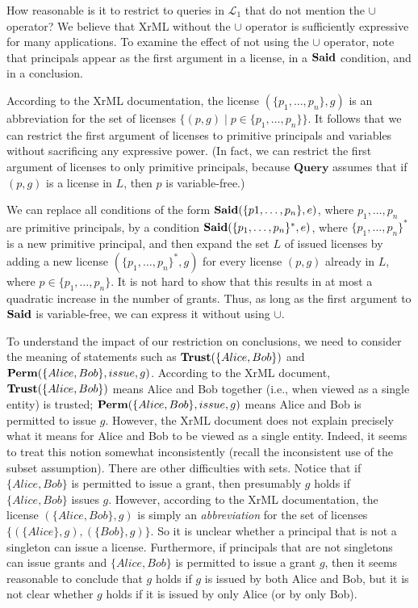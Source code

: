 \documentclass{acmtrans2m}
\newcommand{\<}{
}
\renewcommand{\>}{\rangle}
\newcommand{\union}{\cup}
\newcommand{\cL}{\mathcal{L}}
\newcommand{\Said}{\mathit{\bf Said}}
\newcommand{\Permitted}{\mathit{\bf Perm}}
\newcommand{\cc}{e}
\newcommand{\XProc}{\textbf{Query}}
\begin{document}
How reasonable is it to restrict to queries in $\cL_1$ that do not mention the $\union$ operator?  We
believe that XrML without the $\union$ operator is sufficiently expressive for many applications.  To
examine the effect of not using the $\union$ operator, note that principals appear as the first argument
in a license, in a $\Said$ condition, and in a conclusion.
\begin{itemize}
\item According to the XrML documentation, the license $(\{p_1,\ldots, p_n\}, g)$ is an abbreviation for
the set of licenses $\{(p, g)\mid p\in \{p_1, \ldots, p_n\}\}$.  It follows that we can restrict the
first argument of licenses to primitive principals and variables without sacrificing any expressive
power.  (In fact, we can restrict the first argument of licenses to only primitive principals, because
$\XProc$ assumes that if $(p, g)$ is a license in $L$, then $p$ is variable-free.)
\item We
can replace all conditions of the form
$\Said(\{p1, \ldots, p_n\},\cc)$, where $p_1, \ldots, p_n$ are primitive principals, by a condition
$\Said(\{p_1, \ldots, p_n\}^*,\cc)$, where $\{p_1, \ldots, p_n\}^*$ is a new primitive principal, and then
expand the set $L$ of issued licenses by adding a new license $(\{p_1, \ldots, p_n\}^*, g)$ for every
license $(p, g)$ already in $L$, where $p \in \{p_1, \ldots, p_n\}$.  It is not hard to show that this
results in at most a quadratic increase in the number of grants.  Thus, as long as the first argument to
$\Said$ is variable-free, we can express it without using $\union$.
\begin{sloppypar}
\item To understand the impact of our restriction on conclusions, we need to consider the meaning of
statements such as $\mathit{\bf Trust}(\mathit\{Alice, Bob\})$ and
$\Permitted(\mathit\{Alice, Bob\}, issue, g)$.  According to the XrML document,
$\mathit{\bf Trust}(\mathit\{Alice, Bob\})$ means Alice and Bob together (i.e., when viewed as a single
entity) is trusted; $\Permitted(\mathit\{Alice, Bob\}, issue, g)$ means Alice and Bob is permitted to issue
$g$.  However, the XrML document does not explain precisely what it means for Alice and Bob to be viewed as
a single entity.  Indeed, it seems to treat this notion somewhat inconsistently (recall the inconsistent use
of the subset assumption).  There are other difficulties with sets.  Notice that if
$\{\mathit{Alice}, \mathit{Bob}\}$ is permitted to issue a grant, then presumably $g$ holds if
$\{\mathit{Alice}, \mathit{Bob}\}$ issues $g$.  However, according to the XrML documentation, the license
$(\{\mathit{Alice}, \mathit{Bob}\}, g)$ is simply an \emph{abbreviation} for the set of licenses
$\{(\{\mathit{Alice}\}, g), (\{\mathit{Bob}\}, g)\}$.  So it is unclear whether a principal that is not a
singleton can issue a license.  Furthermore, if principals that are not singletons can issue grants and
$\{\mathit{Alice}, \mathit{Bob}\}$ is permitted to issue a grant $g$, then it seems reasonable to conclude
that $g$ holds if $g$ is issued by both Alice and Bob, but it is not clear whether $g$ holds if it is issued
by only Alice (or by only Bob).
\end{sloppypar}


\end{itemize}
\end{document}
